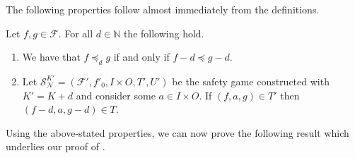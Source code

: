 \documentclass[runningheads,a4paper,draft]{llncs}
\newcommand{\calF}{\mathcal{F}}
\newcommand{\calN}{\mathcal{N}}
\newcommand{\calS}{\mathcal{S}}
\begin{document}
The following properties follow almost immediately from the definitions.
\begin{lemma}\label{lem:simple-props}
  Let $f,g \in \calF$. For all $d \in \mathbb{N}$ the following hold.
  \begin{enumerate}
    \item We have that $f \preceq_d g$ if and only
      if $f - d \preceq g - d$. \label{itm:ord-op}
    \item Let $\calS^{K'}_\calN = (\calF',f'_0,I \times O,T',U')$ be the safety
      game constructed with $K' = K + d$ and consider some $a \in I \times O$.
      If $(f,a,g) \in T'$ then $(f - d, a, g - d) \in T$.
      \label{itm:op-games}
  \end{enumerate}
\end{lemma}

Using the above-stated properties, we can now prove the following result which
underlies our proof of .
\end{document}
